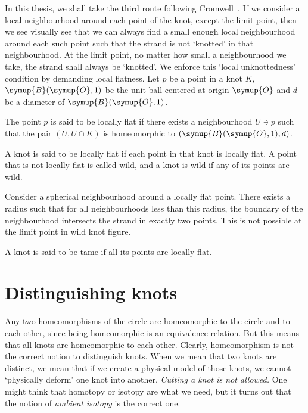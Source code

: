 In this thesis, we shall take the third route following Cromwell~\cite[chp.~1]{cromwell}. If we consider a local neighbourhood around each point of the knot, except the limit point, then we see visually see that we can always find a small enough local neighbourhood around each such point such that the strand is not `knotted' in that neighbourhood. At the limit point, no matter how small a neighbourhood we take, the strand shall always be `knotted'. We enforce this `local unknottedness' condition by demanding local flatness. Let \(p\) be a point in a knot \(K\), \(\symup{B}(\symup{O}, 1)\) be the unit ball centered at origin \(\symup{O}\) and \(d\) be a diameter of \(\symup{B}(\symup{O}, 1)\).
\begin{defn}
    The point \(p\) is said to be locally flat if there exists a neighbourhood \(U \ni p\) such that the pair \((U, U \cap K)\) is homeomorphic to \((\symup{B}(\symup{O}, 1), d)\).

    A knot is said to be locally flat if each point in that knot is locally flat. A point that is not locally flat is called wild, and a knot is wild if any of its points are wild.
\end{defn}

Consider a spherical neighbourhood around a locally flat point. There exists a radius such that for all neighbourhoods less than this radius, the boundary of the neighbourhood intersects the strand in exactly two points. This is not possible at the limit point in wild knot figure.

\begin{defn}
    A knot is said to be tame if all its points are locally flat.
\end{defn}

\section{Distinguishing knots}

Any two homeomorphisms of the circle are homeomorphic to the circle and to each other, since being homeomorphic is an equivalence relation. But this means that all knots are homeomorphic to each other. Clearly, homeomorphism is not the correct notion to distinguish knots. When we mean that two knots are distinct, we mean that if we create a physical model of those knots, we cannot `physically deform' one knot into another. \textit{Cutting a knot is not allowed.} One might think that homotopy or isotopy are what we need, but it turns out that the notion of \textit{ambient isotopy} is the correct one.

